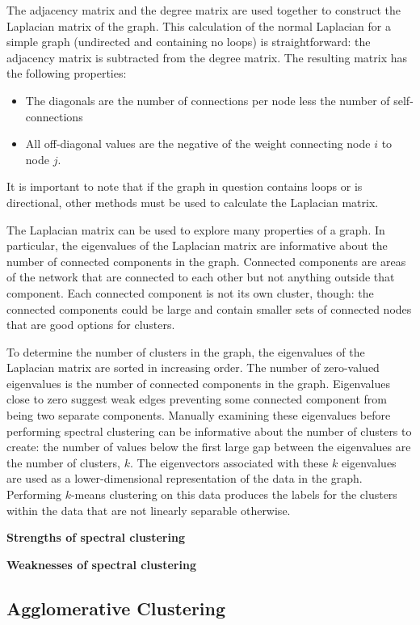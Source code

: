 The adjacency matrix and the degree matrix are used together to construct the Laplacian matrix of the graph. This calculation of the normal Laplacian for a simple graph (undirected and containing no loops) is straightforward: the adjacency matrix is subtracted from the degree matrix. The resulting matrix has the following properties:
\begin{itemize}
\item The diagonals are the number of connections per node less the number of self-connections
\item All off-diagonal values are the negative of the weight connecting node $i$ to node $j$.
\end{itemize}
It is important to note that if the graph in question contains loops or is directional, other methods must be used to calculate the Laplacian matrix. 

The Laplacian matrix can be used to explore many properties of a graph. In particular, the eigenvalues of the Laplacian matrix are informative about the number of connected components in the graph. Connected components are areas of the network that are connected to each other but not anything outside that component. Each connected component is not its own cluster, though: the connected components could be large and contain smaller sets of connected nodes that are good options for clusters.

To determine the number of clusters in the graph, the eigenvalues of the Laplacian matrix are sorted in increasing order. The number of zero-valued eigenvalues is the number of connected components in the graph. Eigenvalues close to zero suggest weak edges preventing some connected component from being two separate components. Manually examining these eigenvalues before performing spectral clustering can be informative about the number of clusters to create: the number of values below the first large gap between the eigenvalues are the number of clusters, $k$. The eigenvectors associated with these $k$ eigenvalues are used as a lower-dimensional representation of the data in the graph. Performing $k$-means clustering on this data produces the labels for the clusters within the data that are not linearly separable otherwise.

\textbf{Strengths of spectral clustering}

\textbf{Weaknesses of spectral clustering}

\subsection{Agglomerative Clustering}

